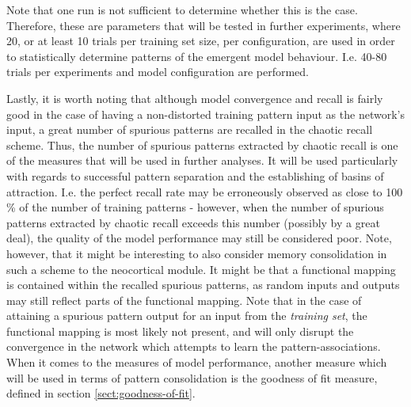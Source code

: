 Note that one run is not sufficient to determine whether this is the case. Therefore, these are parameters that will be tested in further experiments, where 20, or at least 10 trials per training set size, per configuration, are used in order to statistically determine patterns of the emergent model behaviour. I.e. 40-80 trials per experiments and model configuration are performed.

Lastly, it is worth noting that although model convergence and recall is fairly good in the case of having a non-distorted training pattern input as the network's input, a great number of spurious patterns are recalled in the chaotic recall scheme. Thus, the number of spurious patterns extracted by chaotic recall is one of the measures that will be used in further analyses. It will be used particularly with regards to successful pattern separation and the establishing of basins of attraction. I.e. the perfect recall rate may be erroneously observed as close to 100 \% of the number of training patterns - however, when the number of spurious patterns extracted by chaotic recall exceeds this number (possibly by a great deal), the quality of the model performance may still be considered poor. Note, however, that it might be interesting to also consider memory consolidation in such a scheme to the neocortical module. It might be that a functional mapping is contained within the recalled spurious patterns, as random inputs and outputs may still reflect parts of the functional mapping. 
Note that in the case of attaining a spurious pattern output for an input from the \textit{training set}, the functional mapping is most likely not present, and will only disrupt the convergence in the network which attempts to learn the pattern-associations.
When it comes to the measures of model performance, another measure which will be used in terms of pattern consolidation is the goodness of fit measure, defined in section \ref{sect:goodness-of-fit}.


